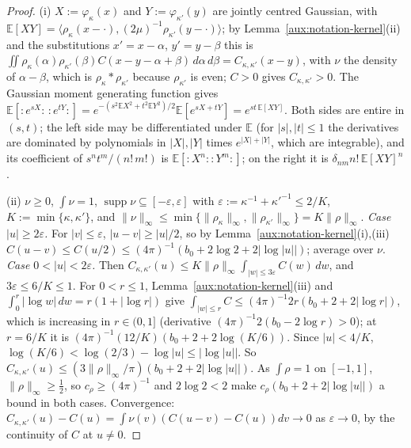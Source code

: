 \documentclass[11pt,a4paper]{article}
\theoremstyle{plain}
\theoremstyle{definition}
\theoremstyle{plain}
\theoremstyle{definition}
\newcommand{\E}{\mathbb{E}}
\newcommand{\ip}[2]{\langle #1,#2\rangle}
\DeclareMathOperator{\supp}{supp}
\begin{document}
\begin{proof}
(i) $X:=\varphi_\kappa(x)$ and $Y:=\varphi_{\kappa'}(y)$ are jointly centred Gaussian, with
$\E[XY]=\ip{\rho_\kappa(x-\cdot)}{(2\mu)^{-1}\rho_{\kappa'}(y-\cdot)}$; by
Lemma~\ref{aux:notation-kernel}(ii) and the substitutions $x'=x-\alpha$, $y'=y-\beta$ this is
$\iint\rho_\kappa(\alpha)\rho_{\kappa'}(\beta)C(x-y-\alpha+\beta)\,d\alpha\,d\beta=
C_{\kappa,\kappa'}(x-y)$, with $\nu$ the density of $\alpha-\beta$, which is
$\rho_\kappa*\rho_{\kappa'}$ because $\rho_{\kappa'}$ is even; $C>0$ gives
$C_{\kappa,\kappa'}>0$.  The Gaussian moment generating function gives
$\E[{:}e^{sX}{:}\,{:}e^{tY}{:}]=e^{-(s^2\E X^2+t^2\E Y^2)/2}\E[e^{sX+tY}]=e^{st\,\E[XY]}$.  Both
sides are entire in $(s,t)$; the left side may be differentiated under $\E$ (for $|s|,|t|\le1$
the derivatives are dominated by polynomials in $|X|,|Y|$ times $e^{|X|+|Y|}$, which are
integrable), and its coefficient of $s^nt^m/(n!\,m!)$ is $\E[{:}X^n{:}{:}Y^m{:}]$; on the right
it is $\delta_{nm}n!\,\E[XY]^n$.

(ii) $\nu\ge0$, $\int\nu=1$, $\supp\nu\subseteq[-\varepsilon,\varepsilon]$ with
$\varepsilon:=\kappa^{-1}+\kappa'^{-1}\le2/K$, $K:=\min\{\kappa,\kappa'\}$, and
$\|\nu\|_\infty\le\min\{\|\rho_\kappa\|_\infty,\|\rho_{\kappa'}\|_\infty\}=K\|\rho\|_\infty$.
\emph{Case $|u|\ge2\varepsilon$.}  For $|v|\le\varepsilon$, $|u-v|\ge|u|/2$, so by
Lemma~\ref{aux:notation-kernel}(i),(iii) $C(u-v)\le C(u/2)\le(4\pi)^{-1}(b_0+2\log2+
2|\log|u||)$; average over $\nu$.  \emph{Case $0<|u|<2\varepsilon$.}  Then
$C_{\kappa,\kappa'}(u)\le K\|\rho\|_\infty\int_{|w|\le3\varepsilon}C(w)\,dw$, and
$3\varepsilon\le6/K\le1$.  For $0<r\le1$, Lemma~\ref{aux:notation-kernel}(iii) and
$\int_0^r|\log w|\,dw=r(1+|\log r|)$ give $\int_{|w|\le r}C\le(4\pi)^{-1}2r(b_0+2+2|\log
r|)$, which is increasing in $r\in(0,1]$ (derivative $(4\pi)^{-1}2(b_0-2\log r)>0$); at
$r=6/K$ it is $(4\pi)^{-1}(12/K)(b_0+2+2\log(K/6))$.  Since $|u|<4/K$,
$\log(K/6)<\log(2/3)-\log|u|\le|\log|u||$.  So $C_{\kappa,\kappa'}(u)\le(3\|\rho\|_\infty/\pi)
(b_0+2+2|\log|u||)$.  As $\int\rho=1$ on $[-1,1]$, $\|\rho\|_\infty\ge\frac12$, so
$c_\rho\ge(4\pi)^{-1}$ and $2\log2<2$ make $c_\rho(b_0+2+2|\log|u||)$ a bound in both cases.
Convergence: $C_{\kappa,\kappa'}(u)-C(u)=\int\nu(v)(C(u-v)-C(u))dv\to0$ as $\varepsilon\to0$, by
the continuity of $C$ at $u\ne0$.


\end{proof}
\end{document}
